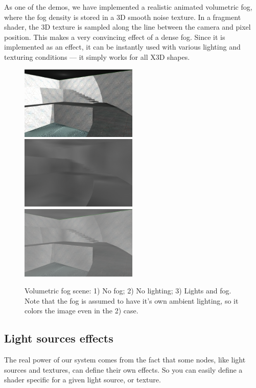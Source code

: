 \documentclass{acmsiggraph}                     %
\begin{document}
As one of the demos, we have implemented a realistic
animated volumetric fog, where the fog density is stored in
a 3D smooth noise texture. In a fragment shader, the 3D texture is sampled
along the line between the camera and pixel position. This makes a very
convincing effect of a dense fog. Since it is implemented as an effect,
it can be instantly used with various lighting and texturing conditions
--- it simply works for all X3D shapes.

\begin{figure}[t]
  \centering
  \includegraphics[width=2.2in]{volumetric_animated_fog_no_fog}
  \includegraphics[width=2.2in]{volumetric_animated_fog_no_light}
  \includegraphics[width=2.2in]{volumetric_animated_fog_all}
  \caption{Volumetric fog scene: 1) No fog; 2) No lighting; 3) Lights and fog.
Note that the fog is assumed to have it's own ambient lighting,
so it colors the image even in the 2) case.}
\end{figure}

\subsection{Light sources effects}

The real power of our system comes from the fact that some nodes,
like light sources and textures, can define their own effects.
So you can easily define a shader specific for a given light source,
or texture.
\end{document}
